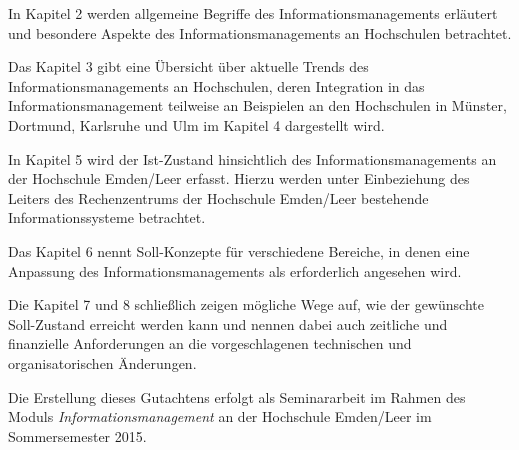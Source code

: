 In Kapitel 2 werden allgemeine Begriffe des Informationsmanagements erläutert und
besondere Aspekte des Informationsmanagements an Hochschulen betrachtet.

Das Kapitel 3 gibt eine Übersicht über aktuelle Trends des Informationsmanagements an Hochschulen, deren 
Integration in das Informationsmanagement teilweise an Beispielen an den Hochschulen in Münster, Dortmund, 
Karlsruhe und Ulm im Kapitel 4 dargestellt wird.

In Kapitel 5 wird der Ist-Zustand hinsichtlich des Informationsmanagements an der Hochschule Emden/Leer erfasst. Hierzu werden unter Einbeziehung des Leiters des Rechenzentrums der Hochschule Emden/Leer bestehende Informationssysteme betrachtet.

Das Kapitel 6 nennt Soll-Konzepte für verschiedene Bereiche, in denen eine Anpassung des 
Informationsmanagements als erforderlich angesehen wird.

Die Kapitel 7 und 8 schließlich zeigen mögliche Wege auf, wie der gewünschte Soll-Zustand erreicht werden kann
und nennen dabei auch zeitliche und finanzielle Anforderungen an die vorgeschlagenen technischen und 
organisatorischen Änderungen.

Die Erstellung dieses Gutachtens erfolgt als Seminararbeit im Rahmen des Moduls \textit{Informationsmanagement} an der Hochschule Emden/Leer im Sommersemester 2015. 